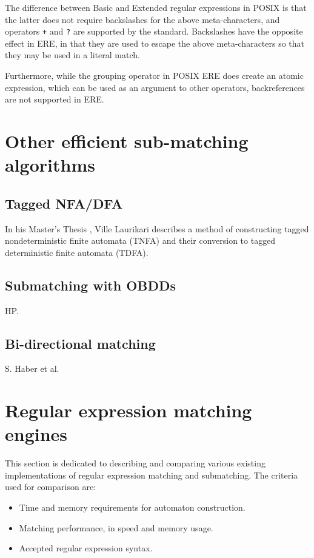 The difference between Basic and Extended regular expressions in POSIX is that
the latter does not require backslashes for the above meta-characters, and
operators \verb'+' and \verb'?' are supported by the standard. Backslashes have
the opposite effect in ERE, in that they are used to escape the above
meta-characters so that they may be used in a literal match.

Furthermore, while the grouping operator in POSIX ERE does create an atomic
expression, which can be used as an argument to other operators, backreferences
are not supported in ERE.


\section{Other efficient sub-matching algorithms}

\subsection{Tagged NFA/DFA}

In his Master's Thesis \cite{laurikari}, Ville Laurikari describes a method of
constructing tagged nondeterministic finite automata (TNFA) and their conversion
to tagged deterministic finite automata (TDFA).


\subsection{Submatching with OBDDs}

HP.


\subsection{Bi-directional matching}

S. Haber et al.


\section{Regular expression matching engines}

This section is dedicated to describing and comparing various existing
implementations of regular expression matching and submatching. The criteria
used for comparison are:

\begin{itemize}
   \item Time and memory requirements for automaton construction.
   \item Matching performance, in speed and memory usage.
   \item Accepted regular expression syntax.
\end{itemize}





